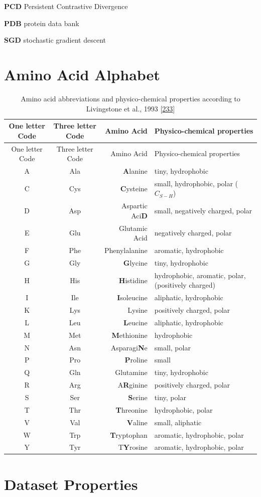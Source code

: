 \documentclass[11pt,a4paper,twoside]{book}
\newcommand{\blandscape}{\begin{landscape}}
\newcommand{\elandscape}{\end{landscape}}
\theoremstyle{definition}
\theoremstyle{definition}
\theoremstyle{remark}
\begin{document}
\textbf{PCD} Persistent Contrastive Divergence

\textbf{PDB} protein data bank

\textbf{SGD} stochastic gradient descent

\chapter{Amino Acid Alphabet}\label{amino-acids}

\blandscape

\begin{longtable}[]{@{}ccrl@{}}
\caption{\label{tab:amino-acid-prop} Amino acid abbreviations and
physico-chemical properties according to Livingstone et al., 1993
{[}\protect\hyperlink{ref-Livingstone1993}{233}{]}}\tabularnewline
\toprule
One letter Code & Three letter Code & Amino Acid & Physico-chemical
properties\tabularnewline
\midrule
\endfirsthead
\toprule
One letter Code & Three letter Code & Amino Acid & Physico-chemical
properties\tabularnewline
\midrule
\endhead
A & Ala & \textbf{A}lanine & tiny, hydrophobic\tabularnewline
C & Cys & \textbf{C}ysteine & small, hydrophobic, polar
(\(C_{S-H}\))\tabularnewline
D & Asp & Aspartic Aci\textbf{D} & small, negatively charged,
polar\tabularnewline
E & Glu & Glutamic Acid & negatively charged, polar\tabularnewline
F & Phe & Phenylalanine & aromatic, hydrophobic\tabularnewline
G & Gly & \textbf{G}lycine & tiny, hydrophobic\tabularnewline
H & His & \textbf{H}istidine & hydrophobic, aromatic, polar, (positively
charged)\tabularnewline
I & Ile & \textbf{I}soleucine & aliphatic, hydrophobic\tabularnewline
K & Lys & Lysine & positively charged, polar\tabularnewline
L & Leu & \textbf{L}eucine & aliphatic, hydrophobic\tabularnewline
M & Met & \textbf{M}ethionine & hydrophobic\tabularnewline
N & Asn & Asparagi\textbf{N}e & small, polar\tabularnewline
P & Pro & \textbf{P}roline & small\tabularnewline
Q & Gln & Glutamine & tiny, hydrophobic\tabularnewline
R & Arg & A\textbf{R}ginine & positively charged, polar\tabularnewline
S & Ser & \textbf{S}erine & tiny, polar\tabularnewline
T & Thr & \textbf{T}hreonine & hydrophobic, polar\tabularnewline
V & Val & \textbf{V}aline & small, aliphatic\tabularnewline
W & Trp & \textbf{T}ryptophan & aromatic, hydrophobic,
polar\tabularnewline
Y & Tyr & T\textbf{Y}rosine & aromatic, hydrophobic,
polar\tabularnewline
\bottomrule
\end{longtable}

\elandscape

\chapter{Dataset Properties}\label{dataset-properties}
\end{document}
